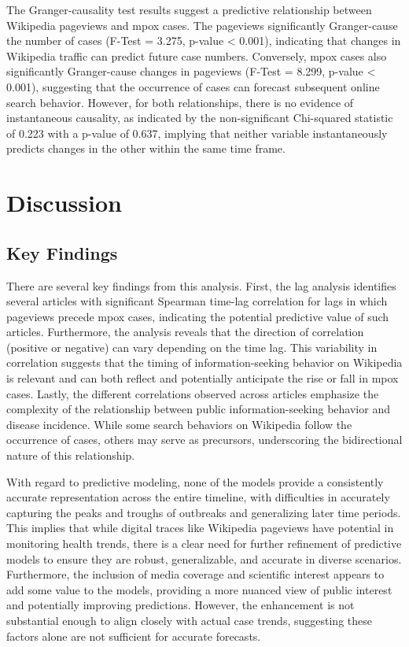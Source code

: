 \documentclass[
  12pt,
]{article}
\begin{document}
The Granger-causality test results suggest a predictive relationship
between Wikipedia pageviews and mpox cases. The pageviews significantly
Granger-cause the number of cases (F-Test = 3.275, p-value \textless{}
0.001), indicating that changes in Wikipedia traffic can predict future
case numbers. Conversely, mpox cases also significantly Granger-cause
changes in pageviews (F-Test = 8.299, p-value \textless{} 0.001),
suggesting that the occurrence of cases can forecast subsequent online
search behavior. However, for both relationships, there is no evidence
of instantaneous causality, as indicated by the non-significant
Chi-squared statistic of 0.223 with a p-value of 0.637, implying that
neither variable instantaneously predicts changes in the other within
the same time frame.

\section{Discussion}\label{discussion}

\subsection{Key Findings}\label{key-findings}

There are several key findings from this analysis. First, the lag
analysis identifies several articles with significant Spearman time-lag
correlation for lags in which pageviews precede mpox cases, indicating
the potential predictive value of such articles. Furthermore, the
analysis reveals that the direction of correlation (positive or
negative) can vary depending on the time lag. This variability in
correlation suggests that the timing of information-seeking behavior on
Wikipedia is relevant and can both reflect and potentially anticipate
the rise or fall in mpox cases. Lastly, the different correlations
observed across articles emphasize the complexity of the relationship
between public information-seeking behavior and disease incidence. While
some search behaviors on Wikipedia follow the occurrence of cases,
others may serve as precursors, underscoring the bidirectional nature of
this relationship.

With regard to predictive modeling, none of the models provide a
consistently accurate representation across the entire timeline, with
difficulties in accurately capturing the peaks and troughs of outbreaks
and generalizing later time periods. This implies that while digital
traces like Wikipedia pageviews have potential in monitoring health
trends, there is a clear need for further refinement of predictive
models to ensure they are robust, generalizable, and accurate in diverse
scenarios. Furthermore, the inclusion of media coverage and scientific
interest appears to add some value to the models, providing a more
nuanced view of public interest and potentially improving predictions.
However, the enhancement is not substantial enough to align closely with
actual case trends, suggesting these factors alone are not sufficient
for accurate forecasts.
\end{document}
